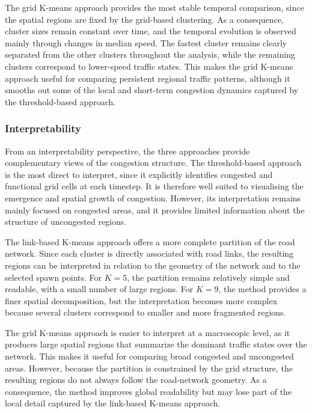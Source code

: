 \documentclass[11pt,a4paper]{article}
\begin{document}
The grid K-means approach provides the most stable temporal comparison, since the spatial regions are fixed by the grid-based clustering. As a consequence, cluster sizes remain constant over time, and the temporal evolution is observed mainly through changes in median speed. The fastest cluster remains clearly separated from the other clusters throughout the analysis, while the remaining clusters correspond to lower-speed traffic states. This makes the grid K-means approach useful for comparing persistent regional traffic patterns, although it smooths out some of the local and short-term congestion dynamics captured by the threshold-based approach.


\subsubsection{Interpretability}
From an interpretability perspective, the three approaches provide complementary views of the congestion structure. The threshold-based approach is the most direct to interpret, since it explicitly identifies congested and functional grid cells at each timestep. It is therefore well suited to visualising the emergence and spatial growth of congestion. However, its interpretation remains mainly focused on congested areas, and it provides limited information about the structure of uncongested regions.

The link-based K-means approach offers a more complete partition of the road network. Since each cluster is directly associated with road links, the resulting regions can be interpreted in relation to the geometry of the network and to the selected spawn points. For $K=5$, the partition remains relatively simple and readable, with a small number of large regions. For $K=9$, the method provides a finer spatial decomposition, but the interpretation becomes more complex because several clusters correspond to smaller and more fragmented regions.

The grid K-means approach is easier to interpret at a macroscopic level, as it produces large spatial regions that summarize the dominant traffic states over the network. This makes it useful for comparing broad congested and uncongested areas. However, because the partition is constrained by the grid structure, the resulting regions do not always follow the road-network geometry. As a consequence, the method improves global readability but may lose part of the local detail captured by the link-based K-means approach.
\end{document}
